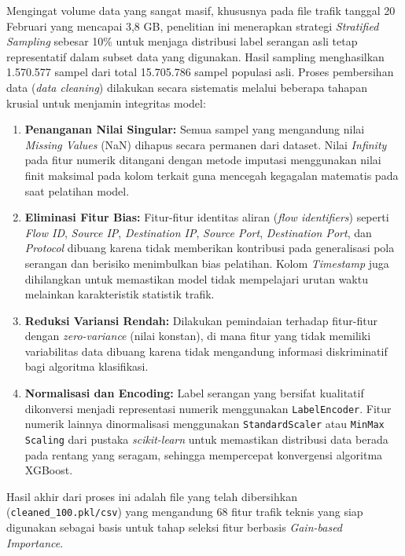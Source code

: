 \documentclass[11pt, a4paper]{article}
\begin{document}
Mengingat volume data yang sangat masif, khususnya pada file trafik tanggal 20 Februari yang mencapai 3,8 GB, penelitian ini menerapkan strategi \textit{Stratified Sampling} sebesar 10\% \cite{ref_stratified} untuk menjaga distribusi label serangan asli tetap representatif dalam subset data yang digunakan. Hasil sampling menghasilkan 1.570.577 sampel dari total 15.705.786 sampel populasi asli. Proses pembersihan data (\textit{data cleaning}) dilakukan secara sistematis melalui beberapa tahapan krusial untuk menjamin integritas model:

\begin{enumerate}
    \item \textbf{Penanganan Nilai Singular:} Semua sampel yang mengandung nilai \textit{Missing Values} (NaN) dihapus secara permanen dari dataset. Nilai \textit{Infinity} pada fitur numerik ditangani dengan metode imputasi menggunakan nilai finit maksimal pada kolom terkait guna mencegah kegagalan matematis pada saat pelatihan model.
    \item \textbf{Eliminasi Fitur Bias:} Fitur-fitur identitas aliran (\textit{flow identifiers}) seperti \textit{Flow ID}, \textit{Source IP}, \textit{Destination IP}, \textit{Source Port}, \textit{Destination Port}, dan \textit{Protocol} dibuang karena tidak memberikan kontribusi pada generalisasi pola serangan dan berisiko menimbulkan bias pelatihan. Kolom \textit{Timestamp} juga dihilangkan untuk memastikan model tidak mempelajari urutan waktu melainkan karakteristik statistik trafik.
    \item \textbf{Reduksi Variansi Rendah:} Dilakukan pemindaian terhadap fitur-fitur dengan \textit{zero-variance} (nilai konstan), di mana fitur yang tidak memiliki variabilitas data dibuang karena tidak mengandung informasi diskriminatif bagi algoritma klasifikasi.
    \item \textbf{Normalisasi dan Encoding:} Label serangan yang bersifat kualitatif dikonversi menjadi representasi numerik menggunakan \texttt{LabelEncoder}. Fitur numerik lainnya dinormalisasi menggunakan \texttt{StandardScaler} atau \texttt{MinMax Scaling} dari pustaka \textit{scikit-learn} \cite{ref_sklearn} untuk memastikan distribusi data berada pada rentang yang seragam, sehingga mempercepat konvergensi algoritma XGBoost.
\end{enumerate}

Hasil akhir dari proses ini adalah file yang telah dibersihkan (\texttt{cleaned\_100.pkl/csv}) yang mengandung 68 fitur trafik teknis yang siap digunakan sebagai basis untuk tahap seleksi fitur berbasis \textit{Gain-based Importance}.
\end{document}
